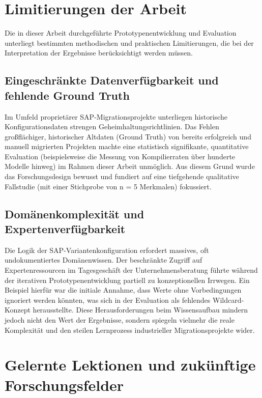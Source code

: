 \section{Limitierungen der Arbeit}
\label{subsec:limitierungen}

Die in dieser Arbeit durchgeführte Prototypenentwicklung und Evaluation unterliegt bestimmten methodischen und praktischen Limitierungen, die bei der Interpretation der Ergebnisse berücksichtigt werden müssen.

\subsection{Eingeschränkte Datenverfügbarkeit und fehlende Ground Truth}
Im Umfeld proprietärer SAP-Migrationsprojekte unterliegen historische Konfigurationsdaten strengen Geheimhaltungsrichtlinien. Das Fehlen großflächiger, historischer Altdaten (\glqq Ground Truth\grqq{}) von bereits erfolgreich und manuell migrierten Projekten machte eine statistisch signifikante, quantitative Evaluation (beispielsweise die Messung von Kompilierraten über hunderte Modelle hinweg) im Rahmen dieser Arbeit unmöglich. Aus diesem Grund wurde das Forschungsdesign bewusst und fundiert auf eine tiefgehende qualitative Fallstudie (mit einer Stichprobe von n = 5 Merkmalen) fokussiert.

\subsection{Domänenkomplexität und Expertenverfügbarkeit}
Die Logik der SAP-Variantenkonfiguration erfordert massives, oft undokumentiertes Domänenwissen. Der beschränkte Zugriff auf Expertenressourcen im Tagesgeschäft der Unternehmensberatung führte während der iterativen Prototypenentwicklung partiell zu konzeptionellen Irrwegen. Ein Beispiel hierfür war die initiale Annahme, dass Werte ohne Vorbedingungen ignoriert werden könnten, was sich in der Evaluation als fehlendes Wildcard-Konzept herausstellte. Diese Herausforderungen beim Wissensaufbau mindern jedoch nicht den Wert der Ergebnisse, sondern spiegeln vielmehr die reale Komplexität und den steilen Lernprozess industrieller Migrationsprojekte wider.

\section{Gelernte Lektionen und zukünftige Forschungsfelder}
\label{subsec:future_work}

